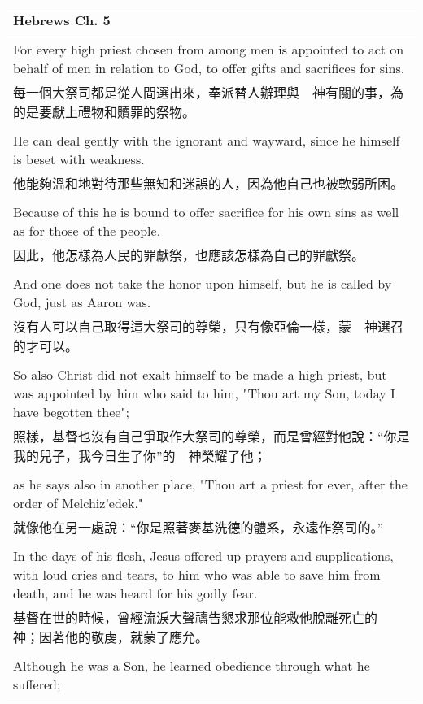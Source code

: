 \documentclass{book}
\begin{document}
\newpage

\begin{tabularx}{\textwidth}{p{}}
\hline
Hebrews Ch. 5 \\
\hline \\
For every high priest chosen from among men is appointed to act on behalf of men in relation to God, to offer gifts and sacrifices for sins. \\
每一個大祭司都是從人間選出來，奉派替人辦理與　神有關的事，為的是要獻上禮物和贖罪的祭物。 \\ \\
He can deal gently with the ignorant and wayward, since he himself is beset with weakness. \\
他能夠溫和地對待那些無知和迷誤的人，因為他自己也被軟弱所困。 \\ \\
Because of this he is bound to offer sacrifice for his own sins as well as for those of the people. \\
因此，他怎樣為人民的罪獻祭，也應該怎樣為自己的罪獻祭。 \\ \\
And one does not take the honor upon himself, but he is called by God, just as Aaron was. \\
沒有人可以自己取得這大祭司的尊榮，只有像亞倫一樣，蒙　神選召的才可以。 \\ \\
So also Christ did not exalt himself to be made a high priest, but was appointed by him who said to him, "Thou art my Son, today I have begotten thee"; \\
照樣，基督也沒有自己爭取作大祭司的尊榮，而是曾經對他說：“你是我的兒子，我今日生了你”的　神榮耀了他； \\ \\
as he says also in another place, "Thou art a priest for ever, after the order of Melchiz'edek." \\
就像他在另一處說：“你是照著麥基洗德的體系，永遠作祭司的。” \\ \\
In the days of his flesh, Jesus offered up prayers and supplications, with loud cries and tears, to him who was able to save him from death, and he was heard for his godly fear. \\
基督在世的時候，曾經流淚大聲禱告懇求那位能救他脫離死亡的　神；因著他的敬虔，就蒙了應允。 \\ \\
Although he was a Son, he learned obedience through what he suffered; \\

\end{tabularx}
\end{document}
